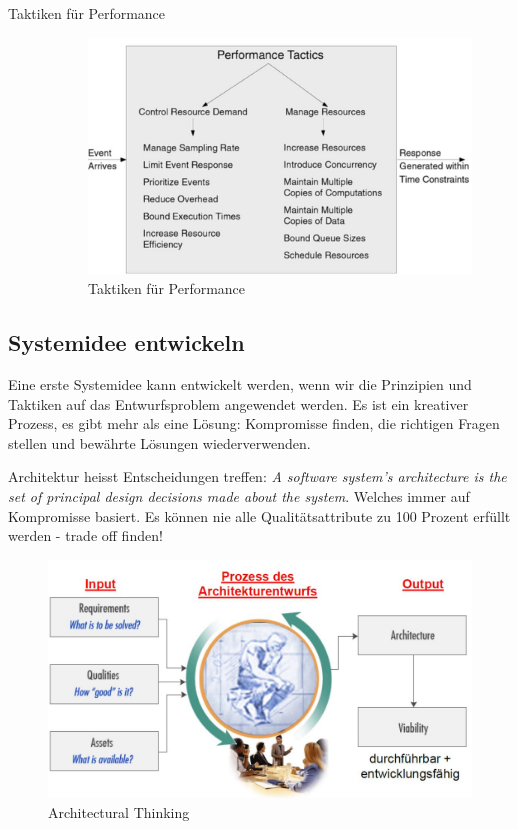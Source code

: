 \begin{description}
	\item[Taktiken für Performance]
	\begin{figure}[h!]
	\centering
	\includegraphics[width=0.7\linewidth]{fig/tactic-performance}
	\caption{Taktiken für Performance}
	\label{fig:tactic-performance}
	\end{figure}
	
\end{description}

\subsection{Systemidee entwickeln}
Eine erste Systemidee kann entwickelt werden, wenn wir die Prinzipien und Taktiken auf das Entwurfsproblem angewendet werden. Es ist ein kreativer Prozess, es gibt mehr als eine Lösung: Kompromisse finden, die richtigen Fragen stellen und bewährte Lösungen wiederverwenden.

Architektur heisst Entscheidungen treffen: \emph{A software system's architecture is the set of principal design decisions made about the system}. Welches immer auf Kompromisse basiert. Es können nie alle Qualitätsattribute zu 100 Prozent erfüllt werden - trade off finden!

\begin{figure}[h!]
\centering
\includegraphics[width=0.7\linewidth]{fig/architectural-thinking}
\caption{Architectural Thinking}
\label{fig:architectural-thinking}
\end{figure}

